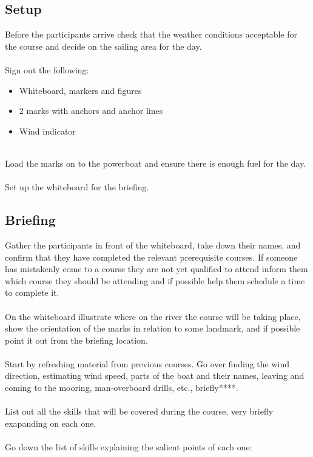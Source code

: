 \documentclass[12pt]{scrartcl}
\begin{document}
\subsection{Setup} \label{subsec:setup}

Before the participants arrive check that the weather conditions acceptable for the course and decide on the sailing area for the day.
\\
\\
Sign out the following:

\label{list:materials}
\begin{itemize}
	\item Whiteboard, markers and figures
	\item 2 marks with anchors and anchor lines
	\item Wind indicator
\end{itemize}
\\
Load the marks on to the powerboat and ensure there is enough fuel for the day.
\\
\\
Set up the whiteboard for the briefing.

\subsection{Briefing} \label{subsec:briefing}

Gather the participants in front of the whiteboard, take down their names, and confirm that they have completed the relevant prerequisite courses. If someone has mistakenly come to a course they are not yet qualified to attend inform them which course they should be attending and if possible help them schedule a time to complete it.
\\
\\
On the whiteboard illustrate where on the river the course will be taking place, show the orientation of the marks in relation to some landmark, and if possible point it out from the briefing location.
\\
\\
Start by refreshing material from previous courses. Go over finding the wind direction, estimating wind speed, parts of the boat and their names, leaving and coming to the mooring, man-overboard drills, etc., briefly****.
\\
\\
List out all the skills that will be covered during the course, very briefly exapanding on each one.
\\
\\
Go down the list of skills explaining the salient points of each one:
\end{document}
